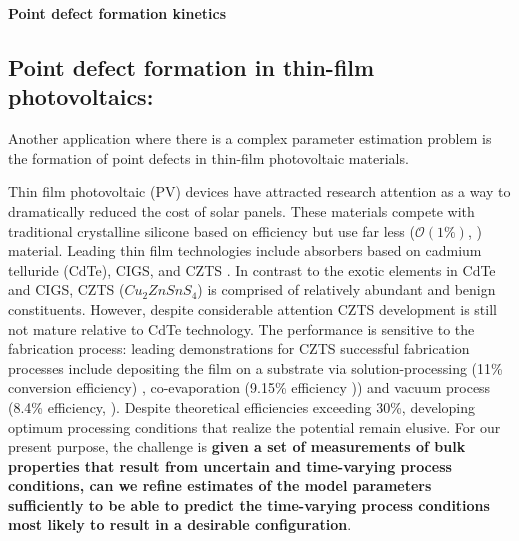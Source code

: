 \documentclass[11pt]{article}
\begin{document}
\begin{center}
{\Large{\textbf{Point defect formation kinetics}}}
\end{center}

 
\subsection*{Point defect formation in thin-film photovoltaics:}

Another application where there is a complex parameter estimation
problem is the formation of point defects in thin-film photovoltaic
materials. 

Thin film photovoltaic (PV) devices have attracted research attention
as a way to dramatically reduced the cost of solar panels. These
materials compete with traditional crystalline silicone based on
efficiency but use far less ($\mathcal{O}(1\%)$, \cite{find})
material. Leading thin film technologies include absorbers based on
cadmium telluride (CdTe), CIGS, and CZTS \cite{JiangY13}. In contrast
to the exotic elements in CdTe and CIGS, CZTS ($Cu_2ZnSnS_4$) is
comprised of relatively abundant and benign constituents. However,
despite considerable attention CZTS development is still not mature
relative to CdTe technology. The performance is sensitive to the
fabrication process: leading demonstrations for CZTS successful
fabrication processes include depositing the film on a substrate via
solution-processing (11\% conversion efficiency) \cite{Todorov13},
co-evaporation (9.15\% efficiency \cite{Repins12})) and vacuum
process (8.4\% efficiency, \cite{Shin11}). Despite theoretical
efficiencies exceeding 30\%, developing optimum processing conditions
that realize the potential remain elusive. For our present
  purpose, the challenge is {\bf given a set of measurements of bulk
    properties that result from uncertain and time-varying process
    conditions, can we refine estimates of the model parameters
    sufficiently to be able to predict the time-varying process
    conditions most likely to result in a desirable configuration}. 
\end{document}
